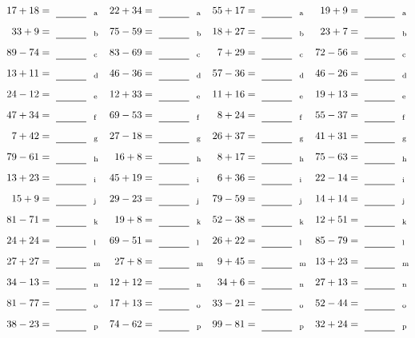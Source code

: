 \documentclass
[
  draft    = true,
  fontsize = 11pt,
  parskip  = half-
]
{scrartcl}
\begin{document}
\clearpage
\begin{align*}
    \pline{17+18}&=\rline{a}
  & \pline{22+34}&=\rline{a}
  & \pline{55+17}&=\rline{a}
  & \pline{19+9}&=\rline{a} \\[1ex]
    \pline{33+9}&=\rline{b}
  & \pline{75-59}&=\rline{b}
  & \pline{18+27}&=\rline{b}
  & \pline{23+7}&=\rline{b} \\[1ex]
    \pline{89-74}&=\rline{c}
  & \pline{83-69}&=\rline{c}
  & \pline{7+29}&=\rline{c}
  & \pline{72-56}&=\rline{c} \\[1ex]
    \pline{13+11}&=\rline{d}
  & \pline{46-36}&=\rline{d}
  & \pline{57-36}&=\rline{d}
  & \pline{46-26}&=\rline{d} \\[1ex]
    \pline{24-12}&=\rline{e}
  & \pline{12+33}&=\rline{e}
  & \pline{11+16}&=\rline{e}
  & \pline{19+13}&=\rline{e} \\[1ex]
    \pline{47+34}&=\rline{f}
  & \pline{69-53}&=\rline{f}
  & \pline{8+24}&=\rline{f}
  & \pline{55-37}&=\rline{f} \\[1ex]
    \pline{7+42}&=\rline{g}
  & \pline{27-18}&=\rline{g}
  & \pline{26+37}&=\rline{g}
  & \pline{41+31}&=\rline{g} \\[1ex]
    \pline{79-61}&=\rline{h}
  & \pline{16+8}&=\rline{h}
  & \pline{8+17}&=\rline{h}
  & \pline{75-63}&=\rline{h} \\[1ex]
    \pline{13+23}&=\rline{i}
  & \pline{45+19}&=\rline{i}
  & \pline{6+36}&=\rline{i}
  & \pline{22-14}&=\rline{i} \\[1ex]
    \pline{15+9}&=\rline{j}
  & \pline{29-23}&=\rline{j}
  & \pline{79-59}&=\rline{j}
  & \pline{14+14}&=\rline{j} \\[1ex]
    \pline{81-71}&=\rline{k}
  & \pline{19+8}&=\rline{k}
  & \pline{52-38}&=\rline{k}
  & \pline{12+51}&=\rline{k} \\[1ex]
    \pline{24+24}&=\rline{l}
  & \pline{69-51}&=\rline{l}
  & \pline{26+22}&=\rline{l}
  & \pline{85-79}&=\rline{l} \\[1ex]
    \pline{27+27}&=\rline{m}
  & \pline{27+8}&=\rline{m}
  & \pline{9+45}&=\rline{m}
  & \pline{13+23}&=\rline{m} \\[1ex]
    \pline{34-13}&=\rline{n}
  & \pline{12+12}&=\rline{n}
  & \pline{34+6}&=\rline{n}
  & \pline{27+13}&=\rline{n} \\[1ex]
    \pline{81-77}&=\rline{o}
  & \pline{17+13}&=\rline{o}
  & \pline{33-21}&=\rline{o}
  & \pline{52-44}&=\rline{o} \\[1ex]
    \pline{38-23}&=\rline{p}
  & \pline{74-62}&=\rline{p}
  & \pline{99-81}&=\rline{p}
  & \pline{32+24}&=\rline{p}
\end{align*}
\end{document}
